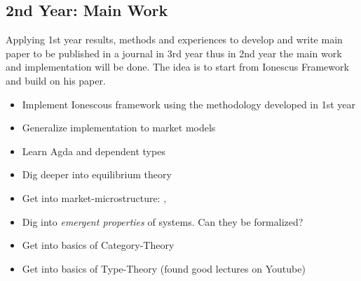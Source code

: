 \subsection{2nd Year: Main Work}
Applying 1st year results, methods and experiences to develop and write main paper to be published in a journal in 3rd year thus in 2nd year the main  work and implementation will be done. The idea is to start from Ionescus Framework \cite{Botta20114025} and build on his paper.

\begin{itemize}
\item Implement Ionescous framework using the methodology developed in 1st year
\item Generalize implementation to market models
\item Learn Agda and dependent types
\item Dig deeper into equilibrium theory 
\item Get into market-microstructure: \cite{LehalleLaruelle2013}, \cite{baker_market_2013}
\item Dig into \textit{emergent properties} of systems. Can they be formalized?
\item Get into basics of Category-Theory \cite{Pierce1991} \cite{spivak_category_2014}
\item Get into basics of Type-Theory (found good lectures on Youtube)

\end{itemize}